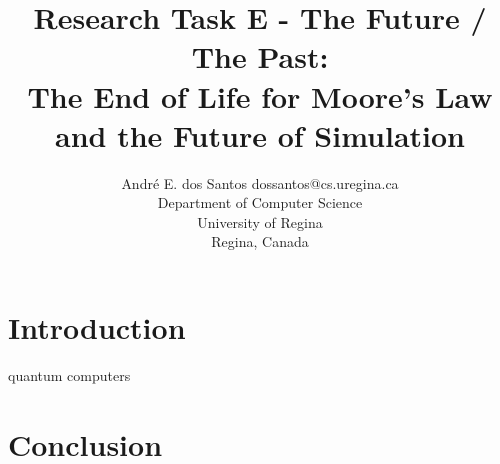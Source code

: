 \documentclass[twoside,11pt]{article}
\begin{document}
\title{Research Task E - The Future / The Past: \\ The End of Life for Moore’s Law \\and the Future of Simulation}

\author{\name André E. dos Santos \email dossantos@cs.uregina.ca \\
\addr Department of Computer Science \\
University of Regina \\ 
Regina, Canada
}



\maketitle

\begin{abstract}%

\end{abstract}




\section{Introduction}
\label{sec:intro}


quantum computers 









\section{Conclusion}
\label{sec:conc}








\vskip 0.2in

\end{document}
